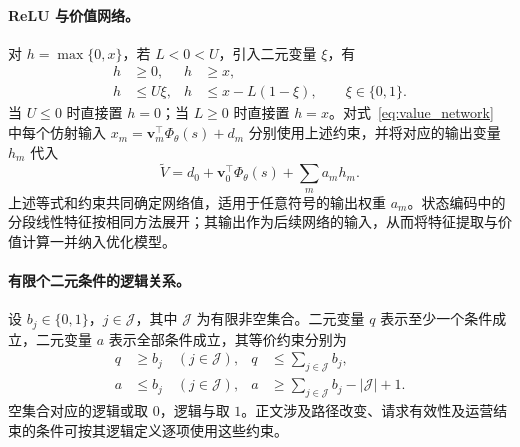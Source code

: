 \paragraph{ReLU 与价值网络。}
对 $h=\max\{0,x\}$，若 $L<0<U$，引入二元变量 $\xi$，有
\begin{equation}
\begin{aligned}
h&\ge 0, & h&\ge x,\\
h&\le U\xi, & h&\le x-L(1-\xi),
\qquad \xi\in\{0,1\}.
\end{aligned}
\label{lin:relu}
\end{equation}
当 $U\le0$ 时直接置 $h=0$；当 $L\ge0$ 时直接置 $h=x$。对式~\eqref{eq:value_network} 中每个仿射输入 $x_m=\boldsymbol v_m^\top\Phi_\theta(s)+d_m$ 分别使用上述约束，并将对应的输出变量 $h_m$ 代入
\begin{equation}
\widetilde V=d_0+\boldsymbol v_0^\top\Phi_\theta(s)+\sum_m a_m h_m.
\label{lin:network}
\end{equation}
上述等式和约束共同确定网络值，适用于任意符号的输出权重 $a_m$。状态编码中的分段线性特征按相同方法展开；其输出作为后续网络的输入，从而将特征提取与价值计算一并纳入优化模型。

\paragraph{有限个二元条件的逻辑关系。}
设 $b_j\in\{0,1\}$，$j\in\mathcal J$，其中 $\mathcal J$ 为有限非空集合。二元变量 $q$ 表示至少一个条件成立，二元变量 $a$ 表示全部条件成立，其等价约束分别为
\begin{equation}
\begin{aligned}
q&\ge b_j\quad(j\in\mathcal J), & q&\le\sum_{j\in\mathcal J}b_j,\\
a&\le b_j\quad(j\in\mathcal J), & a&\ge\sum_{j\in\mathcal J}b_j-|\mathcal J|+1.
\end{aligned}
\label{lin:logic}
\end{equation}
空集合对应的逻辑或取 $0$，逻辑与取 $1$。正文涉及路径改变、请求有效性及运营结束的条件可按其逻辑定义逐项使用这些约束。

